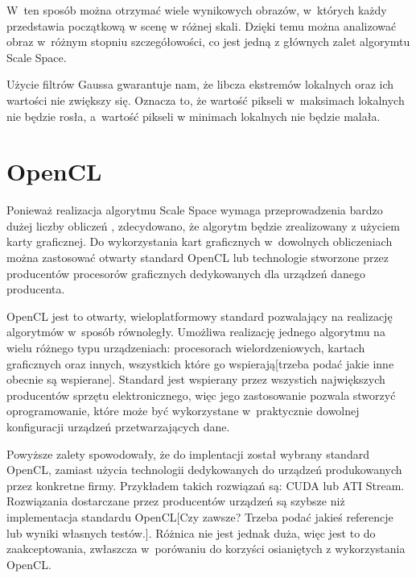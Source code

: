 W~ten sposób można otrzymać wiele wynikowych obrazów, w~których każdy przedstawia początkową w scenę w różnej skali. Dzięki temu można analizować obraz w~różnym stopniu szczegółowości, co jest jedną z głównych zalet algorymtu Scale Space.

Użycie filtrów Gaussa gwarantuje nam, że libcza ekstremów lokalnych oraz ich wartości nie zwiększy się. Oznacza to, że wartość pikseli w~maksimach lokalnych nie będzie rosła, a~wartość pikseli w minimach lokalnych nie będzie malała.


\section{OpenCL}
\label{sec:OpenCL}

Ponieważ realizacja algorytmu Scale Space wymaga przeprowadzenia bardzo dużej liczby obliczeń , zdecydowano, że algorytm będzie zrealizowany z użyciem karty graficznej. Do wykorzystania kart graficznych w~dowolnych obliczeniach można zastosować otwarty standard OpenCL lub technologie stworzone przez producentów procesorów graficznych dedykowanych dla urządzeń danego producenta.

OpenCL jest to otwarty, wieloplatformowy standard pozwalający na realizację algorytmów w~sposób równoległy. Umożliwa realizację jednego algorytmu na wielu różnego typu urządzeniach: procesorach wielordzeniowych, kartach graficznych oraz innych, wszystkich które go wspierają[trzeba podać jakie inne obecnie są wspierane]. Standard jest wspierany przez wszystich największych producentów sprzętu elektronicznego, więc jego zastosowanie pozwala stworzyć oprogramowanie, które może być wykorzystane w~praktycznie dowolnej konfiguracji urządzeń przetwarzających dane.

Powyższe zalety spowodowały, że do implentacji został wybrany standard OpenCL, zamiast użycia technologii dedykowanych do urządzeń produkowanych przez konkretne firmy. Przykładem takich rozwiązań są: CUDA lub ATI Stream. Rozwiązania dostarczane przez producentów urządzeń są szybsze niż implementacja standardu OpenCL[Czy zawsze? Trzeba podać jakieś referencje lub wyniki własnych testów.]. Różnica nie jest jednak duża, więc jest to do zaakceptowania, zwłaszcza w~porówaniu do korzyści osianiętych z wykorzystania OpenCL.



